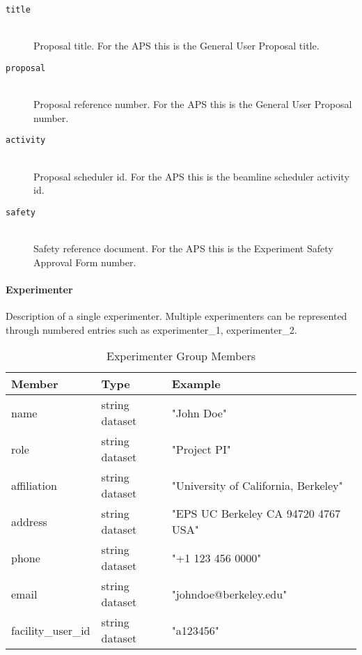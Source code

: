 \begin{description}
\item[\tt {title}] \hfill \\
{Proposal title. For the APS this is the General User Proposal title.}

\item[\tt {proposal}] \hfill \\
{Proposal reference number. For the APS this is the General User Proposal
number.}

\item[\tt {activity}] \hfill \\
{Proposal scheduler id. For the APS this is the beamline scheduler activity id.}

\item[\tt {safety}] \hfill \\
{Safety reference document. For the APS this is the Experiment Safety Approval
Form number.}
\end{description}

\paragraph{Experimenter}

Description of a single experimenter. Multiple experimenters can be represented
through numbered entries such as experimenter\_1, experimenter\_2.

\begin{table}[h!]\sffamily \footnotesize
\centering
\caption{Experimenter Group Members}
\begin{tabular}{l l l}
\toprule
\bfseries Member     & \bfseries Type & \bfseries Example \\
\midrule
name & string dataset & "John Doe" \\    
role & string dataset & "Project PI"     \\ 
affiliation & string dataset &  "University of California, Berkeley" \\  
address & string dataset & "EPS  UC Berkeley CA  94720 4767 USA" \\  
phone & string dataset & "+1 123 456 0000" \\    
email & string dataset &  "johndoe@berkeley.edu" \\  
facility\_user\_id & string dataset &  "a123456" \\ 
\bottomrule
\end{tabular}
\label{table:experimenter}
\end{table}

